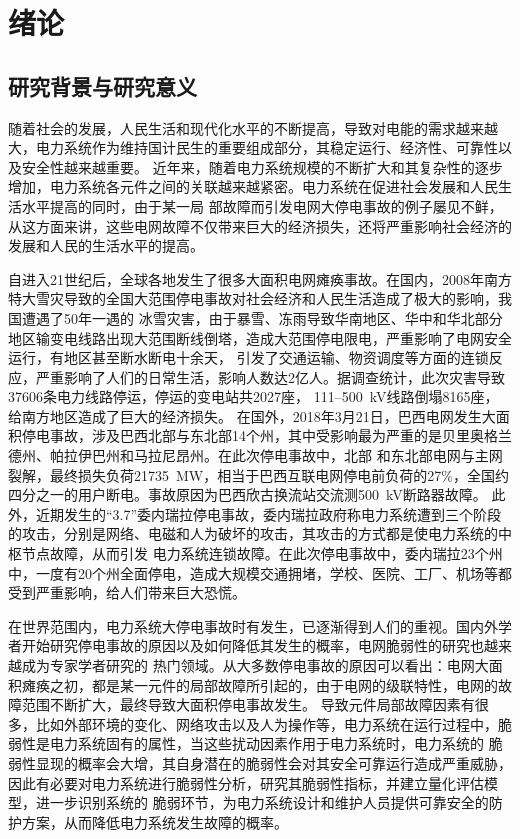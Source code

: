 \chapter{绪论}

\section{研究背景与研究意义}
\label{sec:research_background}
随着社会的发展，人民生活和现代化水平的不断提高，导致对电能的需求越来越大，电力系统作为维持国计民生的重要组成部分，其稳定运行、经济性、可靠性以及安全性越来越重要。
近年来，随着电力系统规模的不断扩大和其复杂性的逐步增加，电力系统各元件之间的关联越来越紧密。电力系统在促进社会发展和人民生活水平提高的同时，由于某一局
部故障而引发电网大停电事故的例子屡见不鲜，从这方面来讲，这些电网故障不仅带来巨大的经济损失，还将严重影响社会经济的发展和人民的生活水平的提高。

自进入21世纪后，全球各地发生了很多大面积电网瘫痪事故。在国内，2008年南方特大雪灾导致的全国大范围停电事故对社会经济和人民生活造成了极大的影响，我国遭遇了50年一遇的
冰雪灾害，由于暴雪、冻雨导致华南地区、华中和华北部分地区输变电线路出现大范围断线倒塔，造成大范围停电限电，严重影响了电网安全运行，有地区甚至断水断电十余天，
引发了交通运输、物资调度等方面的连锁反应，严重影响了人们的日常生活，影响人数达2亿人。据调查统计，此次灾害导致37606条电力线路停运，停运的变电站共2027座，
111--500~kV线路倒塌8165座，给南方地区造成了巨大的经济损失。
在国外，2018年3月21日，巴西电网发生大面积停电事故，涉及巴西北部与东北部14个州，其中受影响最为严重的是贝里奥格兰德州、帕拉伊巴州和马拉尼昂州。在此次停电事故中，北部
和东北部电网与主网裂解，最终损失负荷21735~MW，相当于巴西互联电网停电前负荷的27\%，全国约四分之一的用户断电。事故原因为巴西欣古换流站交流测500~kV断路器故障\cite{refs1}。
此外，近期发生的“3.7”委内瑞拉停电事故，委内瑞拉政府称电力系统遭到三个阶段的攻击，分别是网络、电磁和人为破坏的攻击，其攻击的方式都是使电力系统的中枢节点故障，从而引发
电力系统连锁故障。在此次停电事故中，委内瑞拉23个州中，一度有20个州全面停电，造成大规模交通拥堵，学校、医院、工厂、机场等都受到严重影响，给人们带来巨大恐慌。

在世界范围内，电力系统大停电事故时有发生，已逐渐得到人们的重视。国内外学者开始研究停电事故的原因以及如何降低其发生的概率，电网脆弱性的研究也越来越成为专家学者研究的
热门领域。从大多数停电事故的原因可以看出：电网大面积瘫痪之初，都是某一元件的局部故障所引起的，由于电网的级联特性，电网的故障范围不断扩大，最终导致大面积停电事故发生。
导致元件局部故障因素有很多，比如外部环境的变化、网络攻击以及人为操作等，电力系统在运行过程中，脆弱性是电力系统固有的属性，当这些扰动因素作用于电力系统时，电力系统的
脆弱性显现的概率会大增，其自身潜在的脆弱性会对其安全可靠运行造成严重威胁，因此有必要对电力系统进行脆弱性分析，研究其脆弱性指标，并建立量化评估模型，进一步识别系统的
脆弱环节，为电力系统设计和维护人员提供可靠安全的防护方案，从而降低电力系统发生故障的概率。

